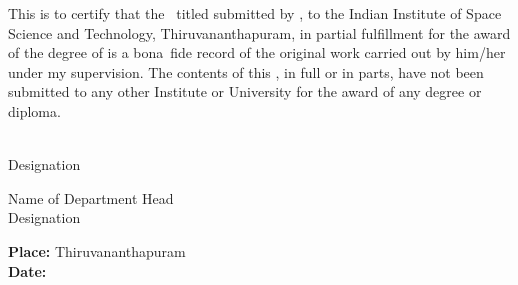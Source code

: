 This is to certify that the \Doctype\ titled \textbf{\textit{\Title}}
submitted by {\bf\Author}, to the Indian Institute of Space Science and
Technology, Thiruvananthapuram, in partial fulfillment for the award of the
degree of {\bf\Degreetext} is a bona~fide record of the original work carried
out by him/her under my supervision. The contents of this \Doctype, in full or
in parts, have not been submitted to any other Institute or University for
the award of any degree or diploma.

\vspace{35mm}
\noindent
\begin{minipage}{0.5\textwidth}
\Advisor\\
Designation
\end{minipage}
\hspace{2cm}
\begin{minipage}{0.5\textwidth}
Name of Department Head\\
Designation
\end{minipage}

\vspace{30mm}
\noindent
\textbf{Place: }Thiruvananthapuram\\
\textbf{Date: \ }\Date


